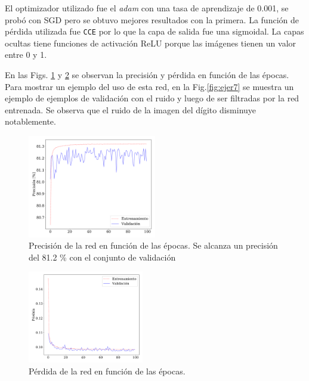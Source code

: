     El optimizador utilizado fue el \emph{adam} con una tasa de aprendizaje de 0.001, se probó con SGD pero se obtuvo mejores resultados con la primera. La función de pérdida utilizada fue \verb|CCE| por lo que la capa de salida fue una sigmoidal. La capas ocultas tiene funciones de activación ReLU porque las imágenes tienen un valor entre 0 y 1.


    En las Figs. \ref{fig:ejer7_acc} y \ref{fig:ejer7_loss} se observan la precisión y pérdida en función de las épocas. Para mostrar un ejemplo del uso de esta red, en la Fig.\ref{fig:ejer7} se muestra un ejemplo de ejemplos de validación con el ruido y luego de ser filtradas por la red entrenada. Se observa que el ruido de la imagen del dígito disminuye notablemente.

    \begin{figure}[H]
        \begin{small}
            \begin{center}
                \includegraphics[width=0.5\textwidth]{Graphs/ejer7_acc.pdf}
            \end{center}
            \caption{Precisión de la red en función de las épocas. Se alcanza un precisión del 81.2 \% con el conjunto de validación}
            \label{fig:ejer7_acc}
        \end{small}
    \end{figure}


    \begin{figure}[H]
        \begin{small}
            \begin{center}
                \includegraphics[width=0.45\textwidth]{Graphs/ejer7_loss.pdf}
            \end{center}
            \caption{Pérdida de la red en función de las épocas. }
            \label{fig:ejer7_loss}
        \end{small}
    \end{figure}


